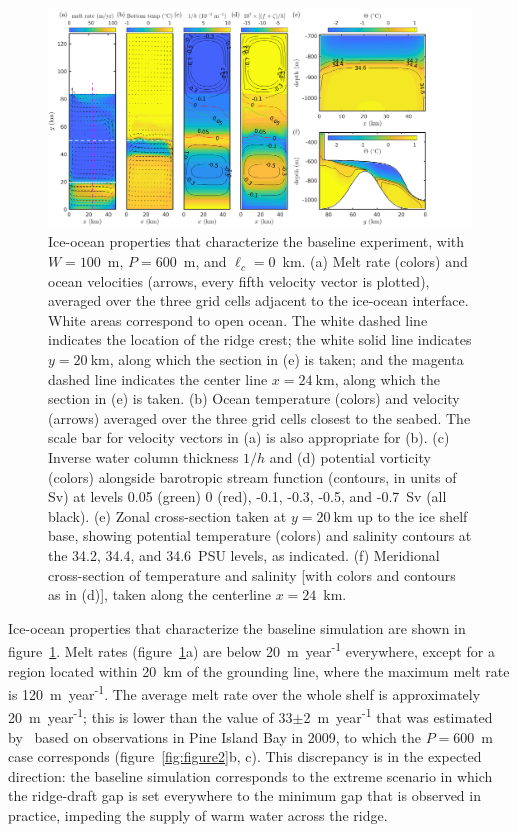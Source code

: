 \documentclass[draft]{agujournal2019}
\begin{document}
\begin{figure}
    \centering
    \includegraphics[width = \textwidth]{../make_figures/plots/figure3.png}
    \caption{Ice-ocean properties that characterize the baseline experiment, with $W = 100$~m, $P = 600$~m, and $\ell_c = 0$~km. (a) Melt rate (colors) and ocean velocities (arrows, every fifth velocity vector is plotted), averaged over the three grid cells adjacent to the ice-ocean interface. White areas correspond to open ocean. The white dashed line indicates the location of the ridge crest; the white solid line indicates $y=20~\text{km}$, along which the section in (e) is taken; and the magenta dashed line indicates the center line $x = 24~\text{km}$, along which the section in (e) is taken. (b) Ocean temperature (colors) and velocity (arrows) averaged over the three grid cells closest to the seabed. The scale bar for velocity vectors in (a) is also appropriate for (b). (c) Inverse water column thickness $1/h$  and (d) potential vorticity (colors) alongside barotropic stream function (contours, in units of Sv) at levels 0.05 (green) 0 (red), -0.1, -0.3, -0.5, and -0.7~Sv (all black). (e) Zonal cross-section taken at $y=20~\text{km}$ up to the ice shelf base, showing potential temperature (colors) and salinity contours at the 34.2, 34.4, and 34.6~PSU levels, as indicated. (f) Meridional cross-section of temperature and salinity [with colors and contours as in (d)], taken along the centerline $x = 24$~km.}
    \label{fig:figure3}
\end{figure}

Ice-ocean properties that characterize the baseline simulation are shown in figure~\ref{fig:figure3}. Melt rates (figure~\ref{fig:figure3}a) are below  20~m~year\textsuperscript{-1} everywhere, except for a region located within 20~km of the grounding line, where the maximum melt rate is 120~m~year\textsuperscript{-1}. The average melt rate over the whole shelf is approximately 20~m~year\textsuperscript{-1}; this is lower than the value of 33$\pm$2~m~year\textsuperscript{-1} that was estimated by~ based on observations in Pine Island Bay in 2009, to which the $P=600$~m case corresponds (figure~\ref{fig:figure2}b, c). This discrepancy is in the expected direction: the baseline simulation corresponds to the extreme scenario in which the ridge-draft gap is set everywhere to the minimum gap that is observed in practice, impeding the supply of warm water across the ridge.
\end{document}
